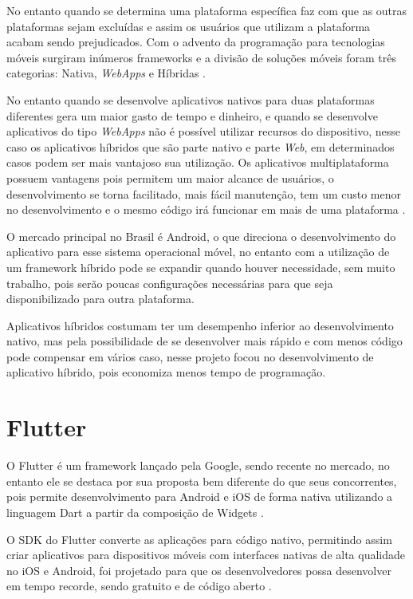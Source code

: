 \documentclass{ifto-tex}
\begin{document}
No entanto quando se determina uma plataforma específica faz com que as outras plataformas sejam excluídas e assim os usuários que utilizam a plataforma acabam sendo prejudicados.
Com o advento da programação para tecnologias móveis surgiram inúmeros frameworks e a divisão de soluções móveis foram três categorias: Nativa, \textit{WebApps} e Híbridas \cite{Desenvol53:online}.

No entanto quando se desenvolve aplicativos nativos para duas plataformas diferentes gera um maior gasto de tempo e dinheiro, e quando se desenvolve aplicativos do tipo \textit{WebApps} não é possível utilizar recursos do dispositivo, nesse caso os aplicativos híbridos que são parte nativo e parte \textit{Web}, em determinados casos podem ser mais vantajoso sua utilização.
Os aplicativos multiplataforma possuem vantagens pois permitem um maior alcance de usuários, o desenvolvimento se torna facilitado, mais fácil manutenção, tem um custo menor no desenvolvimento e o mesmo código irá funcionar em mais de uma plataforma \cite{Benefits70:online}.

O mercado principal no Brasil é Android, o que direciona o desenvolvimento do aplicativo para esse sistema operacional móvel, no entanto com a utilização de um framework híbrido pode se expandir quando houver necessidade, sem muito trabalho, pois serão poucas configurações necessárias para que seja disponibilizado para outra plataforma.

Aplicativos híbridos costumam ter um desempenho inferior ao desenvolvimento nativo, mas pela possibilidade de se desenvolver mais rápido e com menos código pode compensar em vários caso, nesse projeto focou no desenvolvimento de aplicativo híbrido, pois economiza menos tempo de programação.


\section{Flutter}
O Flutter é um framework lançado pela Google, sendo recente no mercado, no entanto ele se destaca por sua proposta bem diferente do que seus concorrentes, pois permite desenvolvimento para Android e iOS de forma nativa utilizando a linguagem Dart a partir da composição de Widgets \cite{Conhecen37:online}.

O SDK do Flutter converte as aplicações para código nativo, permitindo assim criar aplicativos para dispositivos móveis com interfaces nativas de alta qualidade no iOS e Android, foi projetado para que os desenvolvedores possa desenvolver em tempo recorde, sendo gratuito e de código aberto \cite{flutterf54:online}.
\end{document}
